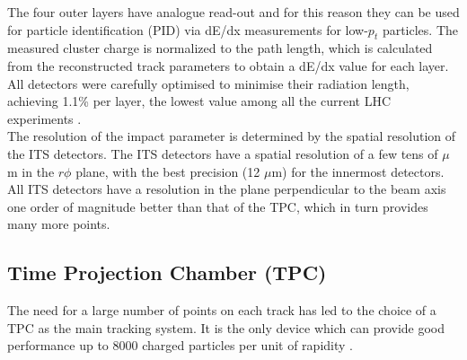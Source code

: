  The four outer layers have analogue read-out and for this reason they can be used for particle identification (PID) via dE/dx measurements for low-$p_t$ particles. The measured cluster charge is normalized to the path length, which is calculated from the reconstructed track parameters to obtain a dE/dx value for each layer. All detectors were carefully optimised to minimise their radiation length, achieving 1.1\% per layer, the lowest value among all the current LHC experiments \cite{ITS-TDRUp}. 
\\



The resolution of the impact parameter is determined by the spatial resolution of the ITS detectors. The ITS detectors have a spatial resolution of a few tens of $\mu$m in the $r\phi$ plane, with the best precision (12  $\mu$m) for the innermost detectors. All ITS detectors have a resolution in the plane perpendicular to the beam axis one order of magnitude better than that of the TPC, which in turn provides many more points.


\subsection{Time Projection Chamber (TPC)}
The need for a large number of points on each track has led to the choice of a TPC as the main tracking system. It is the only device which can provide good performance up to 8000 charged particles per unit of rapidity  \cite{TPC-TDR}. 



